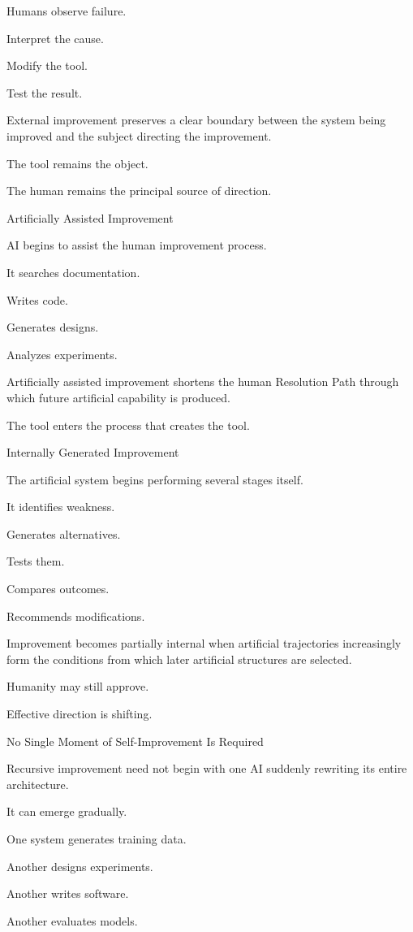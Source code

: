 Humans observe failure.

Interpret the cause.

Modify the tool.

Test the result.

External improvement preserves a clear boundary between the system being improved and the subject directing the improvement.

The tool remains the object.

The human remains the principal source of direction.

Artificially Assisted Improvement

AI begins to assist the human improvement process.

It searches documentation.

Writes code.

Generates designs.

Analyzes experiments.

Artificially assisted improvement shortens the human Resolution Path through which future artificial capability is produced.

The tool enters the process that creates the tool.

Internally Generated Improvement

The artificial system begins performing several stages itself.

It identifies weakness.

Generates alternatives.

Tests them.

Compares outcomes.

Recommends modifications.

Improvement becomes partially internal when artificial trajectories increasingly form the conditions from which later artificial structures are selected.

Humanity may still approve.

Effective direction is shifting.

No Single Moment of Self-Improvement Is Required

Recursive improvement need not begin with one AI suddenly rewriting its entire architecture.

It can emerge gradually.

One system generates training data.

Another designs experiments.

Another writes software.

Another evaluates models.

